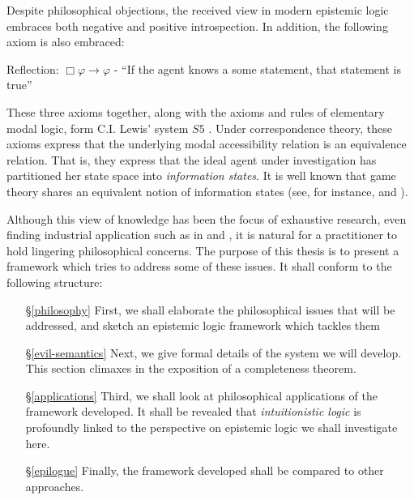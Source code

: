 \documentclass[11pt]{article}
\numberwithin{equation}{subsection}
\renewcommand{\phi}{\varphi}
\begin{document}
Despite philosophical objections, the received view in modern
epistemic logic embraces both negative and positive introspection.  In
addition, the following axiom is also embraced:
\begin{bul}
	\item Reflection: $\Box \phi \to \phi$ - ``If the agent knows a some statement, that statement is true''
\end{bul}
These three axioms together, along with the axioms and rules of
elementary modal logic, form C.I. Lewis' system $S5$
\citep{lewis_symbolic_1951}.  Under correspondence theory, these
axioms express that the underlying modal accessibility relation is an
equivalence relation. That is, they express that the ideal agent under
investigation has partitioned her state space into \emph{information
  states}.  It is well known that game theory shares an equivalent
notion of information states (see, for instance,
\citet{halpern_set-theoretic_1999} and \citet[chapter
3]{rubinstein_modeling_1998}).

Although this view of knowledge has been the focus of exhaustive
research, even finding industrial application such as in \citet{agray_ban_2002} and
\citet{hommersom_toward_2005,hommersom_update_2004}, it is natural for
a practitioner to hold lingering philosophical concerns.  The purpose
of this thesis is to present a framework which tries to address some
of these issues.  It shall conform to the following structure:
\begin{itemize}
  \item[\S\ref{philosophy}] First, we shall elaborate the
    philosophical issues that will be addressed, and sketch an epistemic
    logic framework which tackles them
    \item[\S\ref{evil-semantics}] Next, we give formal details of the
      system we will develop.  This section climaxes in the exposition
      of a completeness theorem.
  \item[\S\ref{applications}]  Third, we shall look at philosophical
    applications of the framework developed.  It shall be revealed that
    \emph{intuitionistic logic} is profoundly linked to the
    perspective on epistemic logic we shall investigate here.
  \item[\S\ref{epilogue}]  Finally, the framework developed shall be
    compared to other approaches.
\end{itemize}
\end{document}
